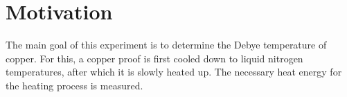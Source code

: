 \section{Motivation}
\label{sec:ziel}
The main goal of this experiment is to determine the Debye temperature of copper.
For this, a copper proof is first cooled down to liquid nitrogen temperatures, after which it is slowly heated up.
The necessary heat energy for the heating process is measured.